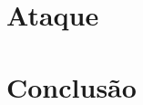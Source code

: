 \documentclass[conference]{IEEEtran}
\begin{document}
\section{Ataque}
\label{sec:attack}


\section{Conclusão}
\label{sec:conclusion}


% 


\end{document}
